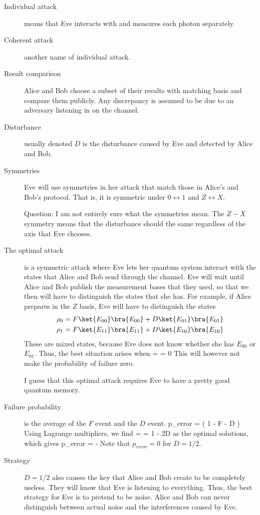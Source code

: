 \begin{description}
\item[Individual attack] means that Eve interacts with and measures each photon separately. 

\item[Coherent attack] another name of individual attack. 

\item[Result comparison] Alice and Bob choose a subset of their results with matching basis and compare them publicly. Any discrepancy is assumed to be due to an adversary listening in on the channel. 

\item[Disturbance] usually denoted $D$ is the disturbance caused by Eve and detected by Alice and Bob.

\item[Symmetries] Eve will use symmetries in her attack that match those in Alice's and Bob's protocol. That is, it is symmetric under $0 \leftrightarrow 1$ and $Z \leftrightarrow X$. 

Question: I am not entirely sure what the symmetries mean. The $Z-X$ symmetry means that the disturbance should the same regardless of the axis that Eve chooses. 

\item[The optimal attack] is a symmetric attack where Eve lets her quantum system interact with the states that Alice and Bob send through the channel. Eve will wait until Alice and Bob publish the measurement bases that they used, so that we then will have to distinguish the states that she has. For example, if Alice prepares in the $Z$ basis, Eve will have to distinguish the states
\begin{align}
\rho_0 &= F \ket{E_{00}} \bra{E_{00}} + D \ket{E_{01}}\bra{E_{01}} \\
\rho_1 & = F \ket{E_{11}}\bra{E_{11}}  + D\ket{E_{10}}\bra{E_{10}}
\end{align}
These are mixed states, because Eve does not know whether she has $E_{00}$ or $E_{01}$. Thus, the best situation arises when
\beq
{} =  = 0
\eeq
This will however not make the probability of failure zero. 

I guess that this optimal attack requires Eve to have a pretty good quantum memory.

\item[Failure probability] is the average of the $F$ event and the $D$ event. 
\beq
p_{error} =  \left( 1 - F - D \right)
\eeq
Using Lagrange multipliers, we find
\beq
\alpha = \beta = 1 - 2D
\eeq
as the optimal solutions, which gives
\beq
p_{error} =  - 
\eeq
Note that $p_{error} = 0$ for $D = 1/2$. 


\item[Strategy] $D=1/2$ also causes the key that Alice and Bob create to be completely useless. They will know that Eve is listening to everything. Thus, the best strategy for Eve is to pretend to be noise. Alice and Bob can never distinguish between actual noise and the interferences caused by Eve. 


\end{description}
